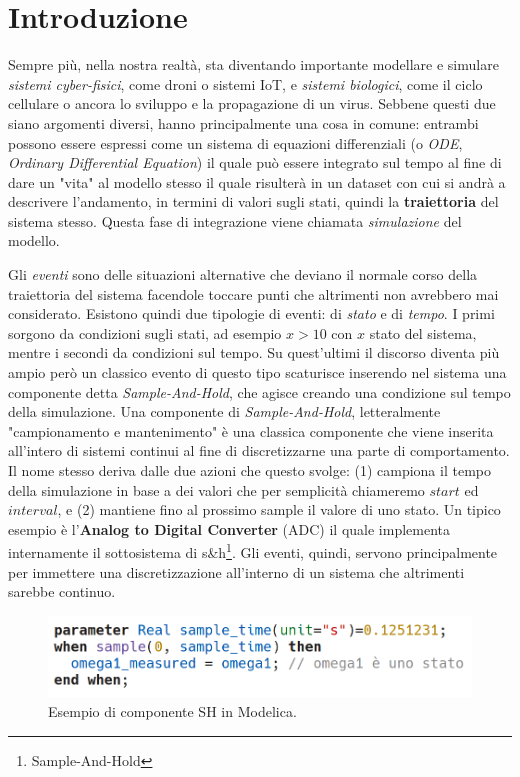 \chapter{Introduzione}
Sempre più, nella nostra realtà, sta diventando importante modellare e simulare \textit{sistemi cyber-fisici}, come droni o sistemi IoT, e \textit{sistemi biologici}, come il ciclo cellulare o ancora lo sviluppo e la propagazione di un virus. Sebbene questi due siano argomenti diversi, hanno principalmente una cosa in comune: entrambi possono essere espressi come un sistema di equazioni differenziali (o \textit{ODE}, \textit{Ordinary Differential Equation}) il quale può essere integrato sul tempo al fine di dare un "vita" al modello stesso il quale risulterà in un dataset con cui si andrà a descrivere l'andamento, in termini di valori sugli stati, quindi la \textbf{traiettoria} del sistema stesso. Questa fase di integrazione viene chiamata \textit{simulazione} del modello.

Gli \textit{eventi} sono delle situazioni alternative che deviano il normale corso della traiettoria del sistema facendole toccare punti che altrimenti non avrebbero mai considerato. Esistono quindi due tipologie di eventi: di \textit{stato} e di \textit{tempo}. I primi sorgono da condizioni sugli stati, ad esempio $x > 10$ con $x$ stato del sistema, mentre i secondi da condizioni sul tempo. Su quest'ultimi il discorso diventa più ampio però un classico evento di questo tipo scaturisce inserendo nel sistema una componente detta \textit{Sample-And-Hold}, che agisce creando una condizione sul tempo della simulazione. Una componente di \textit{Sample-And-Hold}, letteralmente "campionamento e mantenimento" è una classica componente che viene inserita all'intero di sistemi continui al fine di discretizzarne una parte di comportamento. Il nome stesso deriva dalle due azioni che questo svolge: (1) campiona il tempo della simulazione in base a dei valori che per semplicità chiameremo $start$ ed $interval$, e (2) mantiene fino al prossimo sample il valore di uno stato. Un tipico esempio è l'\textbf{Analog to Digital Converter} (ADC) il quale implementa internamente il sottosistema di s\&h\footnote{Sample-And-Hold}. Gli eventi, quindi, servono principalmente per immettere una discretizzazione all'interno di un sistema che altrimenti sarebbe continuo.\\

\begin{figure}[h]
    \centering
    \includegraphics[width=120mm]{Intro/SH.png}
    \caption{Esempio di componente SH in Modelica.}
    \label{fig:SampleAndHoldComponentModelica}
\end{figure}
\newpage
